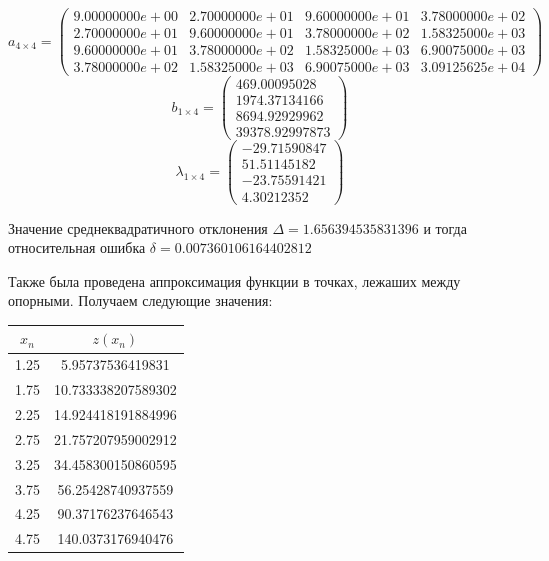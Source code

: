 \documentclass [12pt]{article}
\begin{document}
\[
  a_{4\times 4} = 
  \begin{pmatrix}
    9.00000000e+00 & 2.70000000e+01 & 9.60000000e+01 & 3.78000000e+02\\
    2.70000000e+01 & 9.60000000e+01 & 3.78000000e+02 & 1.58325000e+03\\
    9.60000000e+01 & 3.78000000e+02 & 1.58325000e+03 & 6.90075000e+03\\
    3.78000000e+02 & 1.58325000e+03 & 6.90075000e+03 & 3.09125625e+04
  \end{pmatrix}
\]
\[
  b_{1\times 4} = 
  \begin{pmatrix}
    469.00095028 \\
    1974.37134166 \\
    8694.92929962 \\
    39378.92997873 
  \end{pmatrix}
\]
\[
  \lambda_{1\times 4} = 
  \begin{pmatrix}
    -29.71590847 \\
    51.51145182 \\
    -23.75591421 \\
    4.30212352 
  \end{pmatrix}
\]

Значение среднеквадратичного отклонения $\Delta = 1.656394535831396$ и тогда относительная ошибка $\delta = 0.007360106164402812$

Также была проведена аппроксимация функции в точках, лежаших между опорными. Получаем следующие значения:

\begin{center}
\begin{tabular}{|c|c|}
    \hline
    $x_n$ & $z(x_n)$ \\ \hline
    1.25 & 5.95737536419831 \\ \hline
    1.75 & 10.733338207589302 \\ \hline
    2.25 & 14.924418191884996 \\ \hline
    2.75 & 21.757207959002912 \\ \hline
    3.25 & 34.458300150860595 \\ \hline
    3.75 & 56.25428740937559 \\ \hline
    4.25 & 90.37176237646543 \\ \hline
    4.75 & 140.0373176940476 \\ \hline
\end{tabular}
\end{center}
\end{document}
